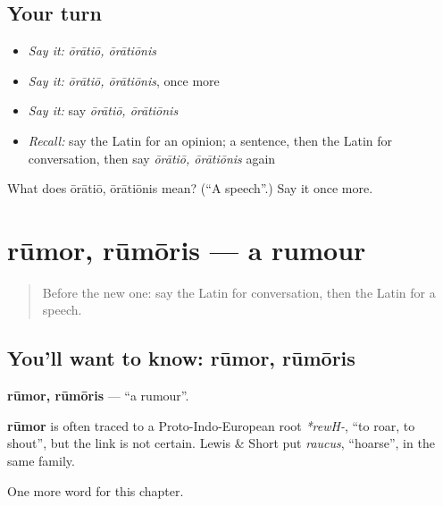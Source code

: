 \subsection*{Your turn}
\begin{itemize}
\raggedright
  \item \emph{Say it:} \emph{ōrātiō, ōrātiōnis}
  \item \emph{Say it:} \emph{ōrātiō, ōrātiōnis}, once more
  \item \emph{Say it:} say \emph{ōrātiō, ōrātiōnis}
  \item \emph{Recall:} say the Latin for an opinion; a sentence, then the Latin for conversation, then say \emph{ōrātiō, ōrātiōnis} again
\end{itemize}

\begin{tcolorbox}[breakable,colback=teal!4,colframe=teal!35!black,title={Before you move on}]
What does ōrātiō, ōrātiōnis mean? (\textquotedblleft{}A speech\textquotedblright{}.) Say it once more.
\end{tcolorbox}
\section[rūmor, rūmōris]{rūmor, rūmōris — a rumour}

\label{lesson:LA-C194-rumor}



\begin{quote}
Before the new one: say the Latin for conversation, then the Latin for a speech.
\end{quote}

\subsection*{You'll want to know: rūmor, rūmōris}
\textbf{rūmor, rūmōris} — \textquotedblleft{}a rumour\textquotedblright{}.

\begin{cousinweb}
\textbf{rūmor} is often traced to a Proto-Indo-European root \emph{*rewH-}, \textquotedblleft{}to roar, to shout\textquotedblright{}, but the link is not certain. Lewis \& Short put \emph{raucus}, \textquotedblleft{}hoarse\textquotedblright{}, in the same family.
\end{cousinweb}

\begin{grammarlens}[title={What you've built}]
One more word for this chapter.
\end{grammarlens}

